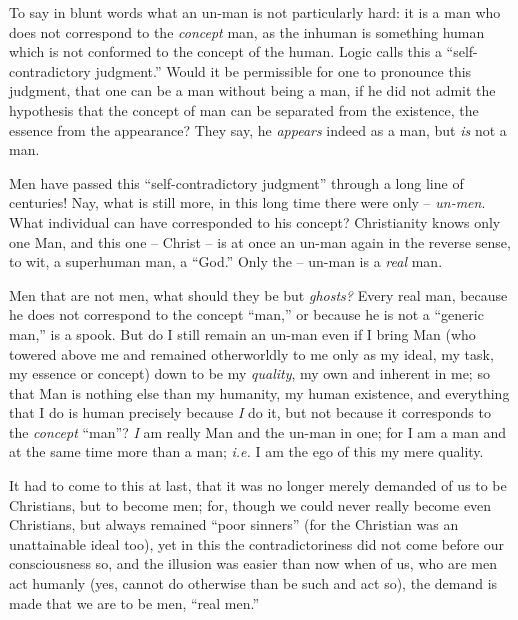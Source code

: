 To say in blunt words what an un-man is not particularly hard: it is a man who 
does not correspond to the \textit{concept} man, as the inhuman is something 
human which is not conformed to the concept of the human. Logic calls this a 
``self-contradictory judgment.'' Would it be permissible for one to 
pronounce this judgment, that one can be a man without being a man, if he did 
not admit the hypothesis that the concept of man can be separated from the 
existence, the essence from the appearance? They say, he \textit{appears} 
indeed as a man, but \textit{is} not a man.

Men have passed this ``self-contradictory judgment'' through a long line of 
centuries! Nay, what is still more, in this long time there were only -- 
\textit{un-men}. What individual can have corresponded to his concept? 
Christianity knows only one Man, and this one -- Christ -- is at once an 
un-man again in the reverse sense, to wit, a superhuman man, a ``God.'' Only 
the -- un-man is a \textit{real} man.

Men that are not men, what should they be but \textit{ghosts?} Every real man, 
because he does not correspond to the concept ``man,'' or because he is not 
a ``generic man,'' is a spook. But do I still remain an un-man even if I 
bring Man (who towered above me and remained otherworldly to me only as my 
ideal, my task, my essence or concept) down to be my \textit{quality}, my own 
and inherent in me; so that Man is nothing else than my humanity, my human 
existence, and everything that I do is human precisely because \textit{I} do 
it, but not because it corresponds to the \textit{concept} ``man''? 
\textit{I} am really Man and the un-man in one; for I am a man and at the same 
time more than a man; \textit{i.e.} I am the ego of this my mere quality.

It had to come to this at last, that it was no longer merely demanded of us to 
be Christians, but to become men; for, though we could never really become 
even Christians, but always remained ``poor sinners'' (for the Christian was 
an unattainable ideal too), yet in this the contradictoriness did not come 
before our consciousness so, and the illusion was easier than now when of us, 
who are men act humanly (yes, cannot do otherwise than be such and act so), 
the demand is made that we are to be men, ``real men.''

